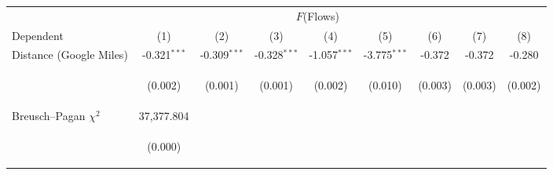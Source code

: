 \begin{tabular}{lcccccccc}
\hline \noalign{\smallskip} & \multicolumn{7}{c}{$ F$(Flows)} &  \\
Dependent & (1) & (2) & (3) & (4) & (5) & (6) & (7) & (8)\\
\noalign{\smallskip}\hline \noalign{\smallskip}Distance (Google Miles) & -0.321$ ^{***}$ & -0.309$ ^{***}$ & -0.328$ ^{***}$ & -1.057$ ^{***}$ & -3.775$ ^{***}$ & -0.372 & -0.372 & -0.280\\
 & \begin{footnotesize}(0.002)\end{footnotesize} & \begin{footnotesize}(0.001)\end{footnotesize} & \begin{footnotesize}(0.001)\end{footnotesize} & \begin{footnotesize}(0.002)\end{footnotesize} & \begin{footnotesize}(0.010)\end{footnotesize} & \begin{footnotesize}(0.003)\end{footnotesize} & \begin{footnotesize}(0.003)\end{footnotesize} & \begin{footnotesize}(0.002)\end{footnotesize}\\
\noalign{\smallskip}Breusch–Pagan $ \chi^2$ & 37,377.804 &  &  &  &  &  &  & \\
 & \begin{footnotesize}(0.000)\end{footnotesize} & \begin{footnotesize}\end{footnotesize} & \begin{footnotesize}\end{footnotesize} & \begin{footnotesize}\end{footnotesize} & \begin{footnotesize}\end{footnotesize} & \begin{footnotesize}\end{footnotesize} & \begin{footnotesize}\end{footnotesize} & \begin{footnotesize}\end{footnotesize}\\

\end{tabular}
